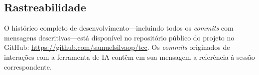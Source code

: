 \documentclass[
  12pt,
  openright,
  twoside,
  a4paper,
  english,
  brazil
]{abntex2}
\begin{document}
\begin{apendicesenv}
\section*{Rastreabilidade}

O histórico completo de desenvolvimento---incluindo todos os
\textit{commits} com mensagens descritivas---está disponível no
repositório público do projeto no GitHub:
\url{https://github.com/samuelsilvaop/tcc}.
Os \textit{commits} originados de interações com a ferramenta de IA
contêm em sua mensagem a referência à sessão correspondente.

\end{apendicesenv}

\printindex
\end{document}
